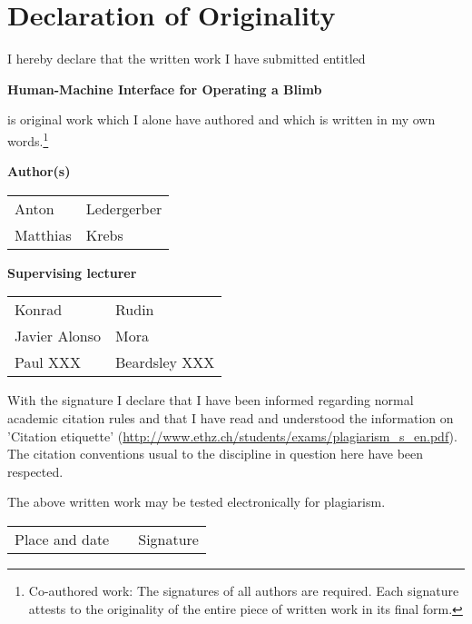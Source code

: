 %

\section*{Declaration of Originality}

\vspace{1cm}

I hereby declare that the written work I have submitted entitled

\vspace{0.5cm}

\textbf{Human-Machine Interface for Operating a Blimb}

\vspace{0.5cm}

is original work which I alone have authored and which is written in my own words.\footnote{Co-authored work: The signatures of all authors are required. Each signature attests to the originality of the entire piece of written work in its final form.}

\vspace{1cm}

\textbf{Author(s)}

\vspace{0.5cm}

\begin{tabular}{ p{5cm} p{5cm} }
  Anton & Ledergerber \\
  Matthias & Krebs \\
\end{tabular}

\vspace{0.5cm}

\textbf{Supervising lecturer}

\vspace{0.5cm}

\begin{tabular}{ p{5cm} p{5cm} }
  Konrad & Rudin \\
  Javier Alonso & Mora \\
  Paul XXX & Beardsley XXX \\
\end{tabular}

\vspace{1cm}

With the signature I declare that I have been informed regarding normal academic citation rules and that I have read and understood the information on 'Citation etiquette' (\url{http://www.ethz.ch/students/exams/plagiarism_s_en.pdf}). The citation conventions usual to the discipline in question here have been respected.

\vspace{0.5cm}

The above written work may be tested electronically for plagiarism.

\vspace{4cm}

\begin{tabular}{ p{5cm} p{1cm} p{5cm} }
  \cline{1-1} \cline{3-3}
  Place and date & & Signature \\
\end{tabular}


